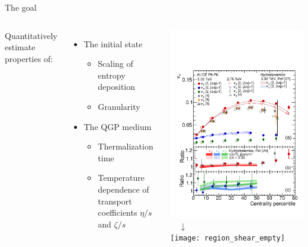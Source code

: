 \documentclass{beamer}
\begin{document}
\begin{frame}{The goal}
  \begin{columns}
    Quantitatively estimate properties of: \\[1ex]
    \begin{itemize}
      \setlength{\itemsep}{1ex}
      \item The initial state
        \begin{itemize}
          \item Scaling of entropy deposition
          \item Granularity
        \end{itemize}
      \item The QGP medium
        \begin{itemize}
          \item Thermalization time
          \item Temperature dependence of transport coefficients $\eta/s$ and $\zeta/s$
        \end{itemize}
    \end{itemize}
    \centering
    \includegraphics[width=\textwidth]{exptfigs/flow} \\
    $\quad\downarrow$ \\
    \texttt{[image: region\_shear\_empty]}
  \end{columns}
\end{frame}
\end{document}

